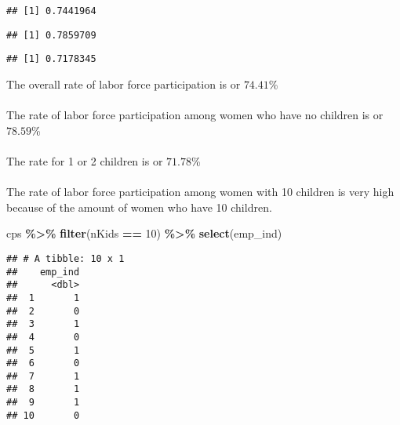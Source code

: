 \documentclass[
]{article}
\newenvironment{Shaded}{\begin{snugshade}}{\end{snugshade}}
\newcommand{\DecValTok}[1]{\textcolor[rgb]{0.00,0.00,0.81}{#1}}
\newcommand{\KeywordTok}[1]{\textcolor[rgb]{0.13,0.29,0.53}{\textbf{#1}}}
\newcommand{\NormalTok}[1]{#1}
\newcommand{\OperatorTok}[1]{\textcolor[rgb]{0.81,0.36,0.00}{\textbf{#1}}}
\newcommand{\StringTok}[1]{\textcolor[rgb]{0.31,0.60,0.02}{#1}}
\begin{document}
\begin{verbatim}
## [1] 0.7441964
\end{verbatim}

\begin{Shaded}
\end{Shaded}

\begin{verbatim}
## [1] 0.7859709
\end{verbatim}

\begin{Shaded}
\end{Shaded}

\begin{verbatim}
## [1] 0.7178345
\end{verbatim}

The overall rate of labor force participation is or \(74.41\)\%\\
~\\
The rate of labor force participation among women who have no children
is or \(78.59\)\%\\
~\\
The rate for 1 or 2 children is or \(71.78\)\%\\
~\\
The rate of labor force participation among women with 10 children is
very high because of the amount of women who have 10 children.

\begin{Shaded}
\begin{Highlighting}[]
\NormalTok{cps }\OperatorTok{\%\textgreater{}\%}\StringTok{ }
\StringTok{  }\KeywordTok{filter}\NormalTok{(nKids }\OperatorTok{==}\StringTok{ }\DecValTok{10}\NormalTok{) }\OperatorTok{\%\textgreater{}\%}
\StringTok{  }\KeywordTok{select}\NormalTok{(emp\_ind)}
\end{Highlighting}
\end{Shaded}

\begin{verbatim}
## # A tibble: 10 x 1
##    emp_ind
##      <dbl>
##  1       1
##  2       0
##  3       1
##  4       0
##  5       1
##  6       0
##  7       1
##  8       1
##  9       1
## 10       0
\end{verbatim}
\end{document}
